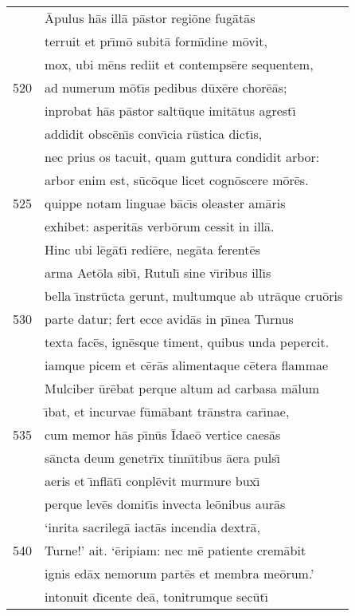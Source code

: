 \documentclass[paper=6in:9in,pagesize=pdftex,
               headinclude=on,footinclude=on,12pt]{scrbook}
\begin{document}
\begin{longtable}[p]{ r l }
 & \=Apulus h\=as ill\=a p\=astor regi\=one fug\=at\=as\\ 
 & terruit et pr\={\i}m\=o subit\=a form\={\i}dine m\=ovit,\\ 
 & mox, ubi m\=ens rediit et contemps\=ere sequentem,\\ 
520 & ad numerum m\=ot\={\i}s pedibus d\=ux\=ere chor\=e\=as;\\ 
 & inprobat h\=as p\=astor salt\=uque imit\=atus agrest\={\i}\\ 
 & addidit obsc\=en\={\i}s conv\={\i}cia r\=ustica dict\={\i}s,\\ 
 & nec prius os tacuit, quam guttura condidit arbor:\\ 
 & arbor enim est, s\=uc\=oque licet cogn\=oscere m\=or\=es.\\ 
525 & quippe notam linguae b\=ac\={\i}s oleaster am\=aris\\ 
 & exhibet: asperit\=as verb\=orum cessit in ill\=a.\\ 
 & \indent Hinc ubi l\=eg\=at\={\i} redi\=ere, neg\=ata ferent\=es\\ 
 & arma Aet\=ola sib\={\i}, Rutul\={\i} sine v\={\i}ribus ill\={\i}s\\ 
 & bella \={\i}nstr\=ucta gerunt, multumque ab utr\=aque cru\=oris\\ 
530 & parte datur; fert ecce avid\=as in p\={\i}nea Turnus\\ 
 & texta fac\=es, ign\=esque timent, quibus unda pepercit.\\ 
 & iamque picem et c\=er\=as alimentaque c\=etera flammae\\ 
 & Mulciber \=ur\=ebat perque altum ad carbasa m\=alum\\ 
 & \={\i}bat, et incurvae f\=um\=abant tr\=anstra car\={\i}nae,\\ 
535 & cum memor h\=as p\={\i}n\=us \=Idae\=o vertice caes\=as\\ 
 & s\=ancta deum genetr\={\i}x tinn\={\i}tibus \=aera puls\={\i}\\ 
 & aeris et \={\i}nfl\=at\={\i} conpl\=evit murmure bux\={\i}\\ 
 & perque lev\=es domit\={\i}s invecta le\=onibus aur\=as\\ 
 & `inrita sacrileg\=a iact\=as incendia dextr\=a,\\ 
540 & Turne!' ait. `\=eripiam: nec m\=e patiente crem\=abit\\ 
 & ignis ed\=ax nemorum part\=es et membra me\=orum.'\\ 
 & intonuit d\={\i}cente de\=a, tonitrumque sec\=ut\={\i}\\ 

\end{longtable}
\end{document}
